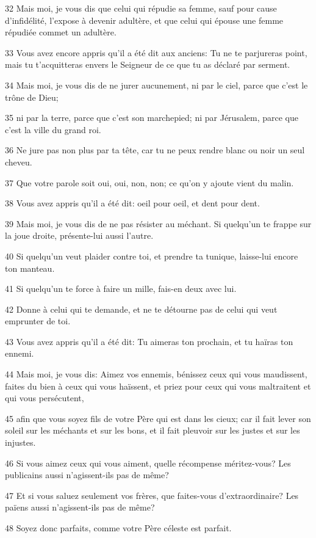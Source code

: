\par 32 Mais moi, je vous dis que celui qui répudie sa femme, sauf pour cause d'infidélité, l'expose à devenir adultère, et que celui qui épouse une femme répudiée commet un adultère.
\par 33 Vous avez encore appris qu'il a été dit aux anciens: Tu ne te parjureras point, mais tu t'acquitteras envers le Seigneur de ce que tu as déclaré par serment.
\par 34 Mais moi, je vous dis de ne jurer aucunement, ni par le ciel, parce que c'est le trône de Dieu;
\par 35 ni par la terre, parce que c'est son marchepied; ni par Jérusalem, parce que c'est la ville du grand roi.
\par 36 Ne jure pas non plus par ta tête, car tu ne peux rendre blanc ou noir un seul cheveu.
\par 37 Que votre parole soit oui, oui, non, non; ce qu'on y ajoute vient du malin.
\par 38 Vous avez appris qu'il a été dit: oeil pour oeil, et dent pour dent.
\par 39 Mais moi, je vous dis de ne pas résister au méchant. Si quelqu'un te frappe sur la joue droite, présente-lui aussi l'autre.
\par 40 Si quelqu'un veut plaider contre toi, et prendre ta tunique, laisse-lui encore ton manteau.
\par 41 Si quelqu'un te force à faire un mille, fais-en deux avec lui.
\par 42 Donne à celui qui te demande, et ne te détourne pas de celui qui veut emprunter de toi.
\par 43 Vous avez appris qu'il a été dit: Tu aimeras ton prochain, et tu haïras ton ennemi.
\par 44 Mais moi, je vous dis: Aimez vos ennemis, bénissez ceux qui vous maudissent, faites du bien à ceux qui vous haïssent, et priez pour ceux qui vous maltraitent et qui vous persécutent,
\par 45 afin que vous soyez fils de votre Père qui est dans les cieux; car il fait lever son soleil sur les méchants et sur les bons, et il fait pleuvoir sur les justes et sur les injustes.
\par 46 Si vous aimez ceux qui vous aiment, quelle récompense méritez-vous? Les publicains aussi n'agissent-ils pas de même?
\par 47 Et si vous saluez seulement vos frères, que faites-vous d'extraordinaire? Les païens aussi n'agissent-ils pas de même?
\par 48 Soyez donc parfaits, comme votre Père céleste est parfait.

